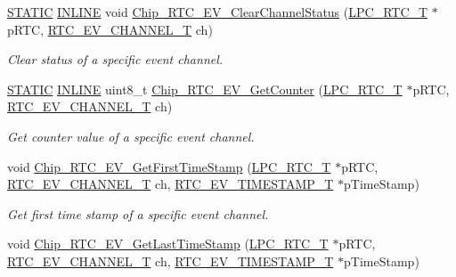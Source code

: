 \begin{DoxyCompactItemize}
\hyperlink{group___l_p_c___types___public___macros_ga10b2d890d871e1489bb02b7e70d9bdfb}{S\+T\+A\+T\+IC} \hyperlink{spifi__18xx__43xx_8h_a2eb6f9e0395b47b8d5e3eeae4fe0c116}{I\+N\+L\+I\+NE} void \hyperlink{group___r_t_c__18_x_x__43_x_x_ga34389a184b0362b6255d36594084be80}{Chip\+\_\+\+R\+T\+C\+\_\+\+E\+V\+\_\+\+Clear\+Channel\+Status} (\hyperlink{struct_l_p_c___r_t_c___t}{L\+P\+C\+\_\+\+R\+T\+C\+\_\+T} $\ast$p\+R\+TC, \hyperlink{group___r_t_c__18_x_x__43_x_x_gaac7e8d7c66860037449fdde1bdfb657b}{R\+T\+C\+\_\+\+E\+V\+\_\+\+C\+H\+A\+N\+N\+E\+L\+\_\+T} ch)
\begin{DoxyCompactList}\small\item\em Clear status of a specific event channel. \end{DoxyCompactList}\item 
\hyperlink{group___l_p_c___types___public___macros_ga10b2d890d871e1489bb02b7e70d9bdfb}{S\+T\+A\+T\+IC} \hyperlink{spifi__18xx__43xx_8h_a2eb6f9e0395b47b8d5e3eeae4fe0c116}{I\+N\+L\+I\+NE} uint8\+\_\+t \hyperlink{group___r_t_c__18_x_x__43_x_x_ga5e03e0be6371bbd1e778f7e10653f045}{Chip\+\_\+\+R\+T\+C\+\_\+\+E\+V\+\_\+\+Get\+Counter} (\hyperlink{struct_l_p_c___r_t_c___t}{L\+P\+C\+\_\+\+R\+T\+C\+\_\+T} $\ast$p\+R\+TC, \hyperlink{group___r_t_c__18_x_x__43_x_x_gaac7e8d7c66860037449fdde1bdfb657b}{R\+T\+C\+\_\+\+E\+V\+\_\+\+C\+H\+A\+N\+N\+E\+L\+\_\+T} ch)
\begin{DoxyCompactList}\small\item\em Get counter value of a specific event channel. \end{DoxyCompactList}\item 
void \hyperlink{group___r_t_c__18_x_x__43_x_x_ga7e3af0c85e9683474f034b2e370181ef}{Chip\+\_\+\+R\+T\+C\+\_\+\+E\+V\+\_\+\+Get\+First\+Time\+Stamp} (\hyperlink{struct_l_p_c___r_t_c___t}{L\+P\+C\+\_\+\+R\+T\+C\+\_\+T} $\ast$p\+R\+TC, \hyperlink{group___r_t_c__18_x_x__43_x_x_gaac7e8d7c66860037449fdde1bdfb657b}{R\+T\+C\+\_\+\+E\+V\+\_\+\+C\+H\+A\+N\+N\+E\+L\+\_\+T} ch, \hyperlink{struct_r_t_c___e_v___t_i_m_e_s_t_a_m_p___t}{R\+T\+C\+\_\+\+E\+V\+\_\+\+T\+I\+M\+E\+S\+T\+A\+M\+P\+\_\+T} $\ast$p\+Time\+Stamp)
\begin{DoxyCompactList}\small\item\em Get first time stamp of a specific event channel. \end{DoxyCompactList}\item 
void \hyperlink{group___r_t_c__18_x_x__43_x_x_gab32567fa96fb9be16d3596b6ab64116a}{Chip\+\_\+\+R\+T\+C\+\_\+\+E\+V\+\_\+\+Get\+Last\+Time\+Stamp} (\hyperlink{struct_l_p_c___r_t_c___t}{L\+P\+C\+\_\+\+R\+T\+C\+\_\+T} $\ast$p\+R\+TC, \hyperlink{group___r_t_c__18_x_x__43_x_x_gaac7e8d7c66860037449fdde1bdfb657b}{R\+T\+C\+\_\+\+E\+V\+\_\+\+C\+H\+A\+N\+N\+E\+L\+\_\+T} ch, \hyperlink{struct_r_t_c___e_v___t_i_m_e_s_t_a_m_p___t}{R\+T\+C\+\_\+\+E\+V\+\_\+\+T\+I\+M\+E\+S\+T\+A\+M\+P\+\_\+T} $\ast$p\+Time\+Stamp)

\end{DoxyCompactItemize}

